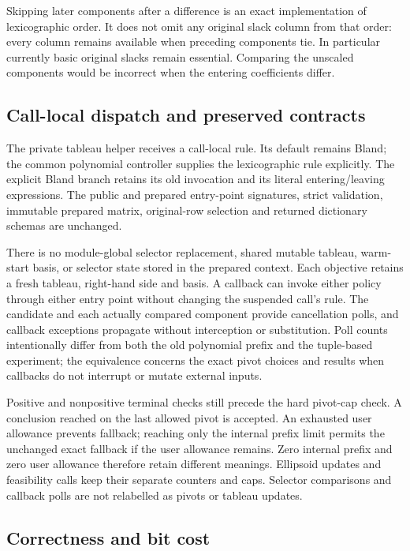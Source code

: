 Skipping later components after a difference is an exact implementation of
lexicographic order.  It does not omit any original slack column from that
order: every column remains available when preceding components tie.
In particular currently basic original slacks remain essential.  Comparing
the unscaled components would be incorrect when the entering coefficients
differ.

\subsection{Call-local dispatch and preserved contracts}

The private tableau helper receives a call-local rule.  Its default remains
Bland; the common polynomial controller supplies the lexicographic rule
explicitly.  The explicit Bland branch retains its old invocation and its
literal entering/leaving expressions.  The public and prepared entry-point
signatures, strict validation, immutable prepared matrix, original-row
selection and returned dictionary schemas are unchanged.

There is no module-global selector replacement, shared mutable tableau,
warm-start basis, or selector state stored in the prepared context.
Each objective retains a fresh tableau, right-hand side and basis.  A
callback can invoke either policy through either entry point without changing
the suspended call's rule.  The candidate and each actually compared
component provide cancellation polls, and callback exceptions propagate
without interception or substitution.  Poll counts intentionally differ
from both the old polynomial prefix and the tuple-based experiment; the
equivalence concerns the exact pivot choices and results when callbacks do
not interrupt or mutate external inputs.

Positive and nonpositive terminal checks still precede the hard pivot-cap
check.  A conclusion reached on the last allowed pivot is accepted.  An
exhausted user allowance prevents fallback; reaching only the internal
prefix limit permits the unchanged exact fallback if the user allowance
remains.  Zero internal prefix and zero user allowance therefore retain
different meanings.  Ellipsoid updates and feasibility calls keep their
separate counters and caps.  Selector comparisons and callback polls are
not relabelled as pivots or tableau updates.

\subsection{Correctness and bit cost}

